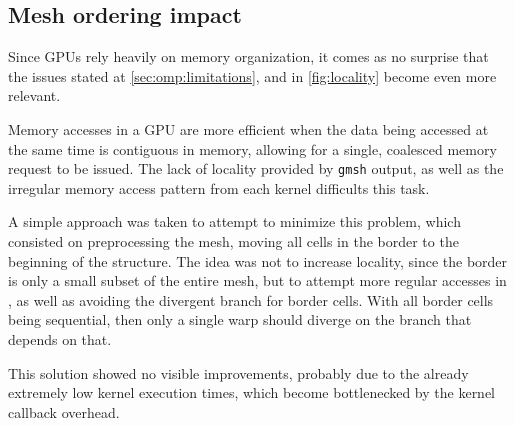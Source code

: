 \subsection{Mesh ordering impact}
\label{subsec:cuda:ordering}

Since GPUs rely heavily on memory organization, it comes as no surprise that the issues stated at \cref{sec:omp:limitations}, and in \cref{fig:locality} become even more relevant.

Memory accesses in a GPU are more efficient when the data being accessed at the same time is contiguous in memory, allowing for a single, coalesced memory request to be issued. The lack of locality provided by \texttt{gmsh} output, as well as the irregular memory access pattern from each kernel difficults this task.

A simple approach was taken to attempt to minimize this problem, which consisted on preprocessing the mesh, moving all cells in the border to the beginning of the structure. The idea was not to increase locality, since the border is only a small subset of the entire mesh, but to attempt more regular accesses in \computeflux, as well as avoiding the divergent branch for border cells. With all border cells being sequential, then only a single warp should diverge on the branch that depends on that.

This solution showed no visible improvements, probably due to the already extremely low kernel execution times, which become bottlenecked by the kernel callback overhead.
